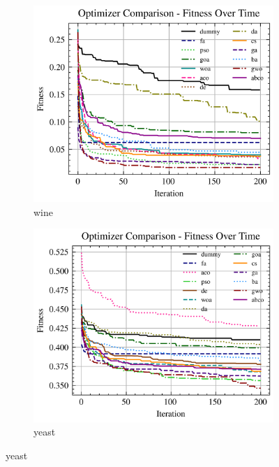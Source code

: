 \begin{figure}[htp]
    \begin{subfigure}[htp]{0.45\textwidth}
        \includegraphics[width=\textwidth]{imagenes/fitness_charts/img/binary/wine/optimizers_fitness_svc.png}
        \caption{wine}
    \end{subfigure}
    \begin{subfigure}[htp]{0.45\textwidth}
        \includegraphics[width=\textwidth]{imagenes/fitness_charts/img/binary/yeast/optimizers_fitness_svc.png}
        \caption{yeast}
    \end{subfigure}


\end{figure}
